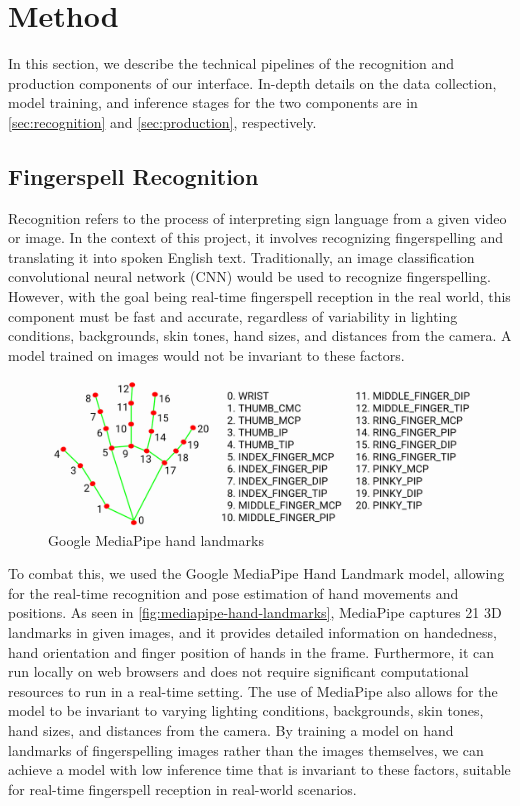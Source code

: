 \documentclass[../paper.tex]{subfiles}
\begin{document}
\section{Method}

In this section, we describe the technical pipelines of the recognition and production components of our interface. In-depth details on the data collection, model training, and inference stages for the two components are in \autoref{sec:recognition} and \autoref{sec:production}, respectively.

\subsection{Fingerspell Recognition}

Recognition refers to the process of interpreting sign language from a given video or image. In the context of this project, it involves recognizing fingerspelling and translating it into spoken English text. Traditionally, an image classification convolutional neural network (CNN) would be used to recognize fingerspelling. However, with the goal being real-time fingerspell reception in the real world, this component must be fast and accurate, regardless of variability in lighting conditions, backgrounds, skin tones, hand sizes, and distances from the camera. A model trained on images would not be invariant to these factors.

\begin{figure}[!htbp]
  \centerline{\includegraphics[width=\linewidth]{../figures/mediapipe-hand-landmarks.png}}
  \caption{Google MediaPipe hand landmarks}\label{fig:mediapipe-hand-landmarks}
\end{figure}

To combat this, we used the Google MediaPipe Hand Landmark \cite{MediaPipe} model, allowing for the real-time recognition and pose estimation of hand movements and positions. As seen in \autoref{fig:mediapipe-hand-landmarks}, MediaPipe captures 21 3D landmarks in given images, and it provides detailed information on handedness, hand orientation and finger position of hands in the frame. Furthermore, it can run locally on web browsers and does not require significant computational resources to run in a real-time setting. The use of MediaPipe also allows for the model to be invariant to varying lighting conditions, backgrounds, skin tones, hand sizes, and distances from the camera. By training a model on hand landmarks of fingerspelling images rather than the images themselves, we can achieve a model with low inference time that is invariant to these factors, suitable for real-time fingerspell reception in real-world scenarios.
\end{document}

